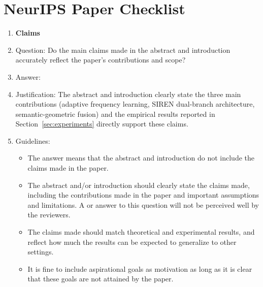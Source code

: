 \section*{NeurIPS Paper Checklist}

\begin{enumerate}

\item {\bf Claims}
    \item[] Question: Do the main claims made in the abstract and introduction accurately reflect the paper's contributions and scope?
    \item[] Answer: \answerYes{}
    \item[] Justification: The abstract and introduction clearly state the three main contributions (adaptive frequency learning, SIREN dual-branch architecture, semantic-geometric fusion) and the empirical results reported in Section~\ref{sec:experiments} directly support these claims.
    \item[] Guidelines:
    \begin{itemize}
        \item The answer \answerNA{} means that the abstract and introduction do not include the claims made in the paper.
        \item The abstract and/or introduction should clearly state the claims made, including the contributions made in the paper and important assumptions and limitations. A \answerNo{} or \answerNA{} answer to this question will not be perceived well by the reviewers.
        \item The claims made should match theoretical and experimental results, and reflect how much the results can be expected to generalize to other settings.
        \item It is fine to include aspirational goals as motivation as long as it is clear that these goals are not attained by the paper.
    \end{itemize}


\end{enumerate}
